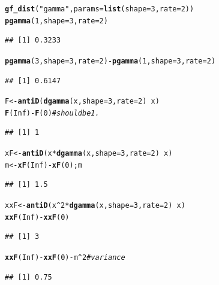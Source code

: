 \documentclass[twoside]{book}\usepackage[]{graphicx}\usepackage[]{xcolor}
\makeatletter
\newcommand{\hlnum}[1]{\textcolor[rgb]{0.686,0.059,0.569}{#1}}%
\newcommand{\hlstr}[1]{\textcolor[rgb]{0.192,0.494,0.8}{#1}}%
\newcommand{\hlcom}[1]{\textcolor[rgb]{0.678,0.584,0.686}{\textit{#1}}}%
\newcommand{\hlopt}[1]{\textcolor[rgb]{0,0,0}{#1}}%
\newcommand{\hlstd}[1]{\textcolor[rgb]{0.345,0.345,0.345}{#1}}%
\newcommand{\hlkwb}[1]{\textcolor[rgb]{0.69,0.353,0.396}{#1}}%
\newcommand{\hlkwc}[1]{\textcolor[rgb]{0.333,0.667,0.333}{#1}}%
\newcommand{\hlkwd}[1]{\textcolor[rgb]{0.737,0.353,0.396}{\textbf{#1}}}%
\newenvironment{kframe}{%
 \def\at@end@of@kframe{}%
 \ifinner\ifhmode%
  \def\at@end@of@kframe{\end{minipage}}%
  \begin{minipage}{\columnwidth}%
 \fi\fi%
 \def\FrameCommand##1{\hskip\@totalleftmargin \hskip-\fboxsep
 \colorbox{shadecolor}{##1}\hskip-\fboxsep
     \hskip-\linewidth \hskip-\@totalleftmargin \hskip\columnwidth}%
 \MakeFramed {\advance\hsize-\width
   \@totalleftmargin\z@ \linewidth\hsize
   \@setminipage}}%
 {\par\unskip\endMakeFramed%
 \at@end@of@kframe}
\newenvironment{knitrout}{}{} %
\makeatother
\begin{document}
\begin{solution}
\begin{knitrout}
\color{fgcolor}\begin{kframe}
\begin{alltt}
\hlkwd{gf_dist}\hlstd{(}\hlstr{"gamma"}\hlstd{,} \hlkwc{params} \hlstd{=} \hlkwd{list}\hlstd{(}\hlkwc{shape} \hlstd{=} \hlnum{3}\hlstd{,} \hlkwc{rate} \hlstd{=} \hlnum{2}\hlstd{))}
\hlkwd{pgamma}\hlstd{(}\hlnum{1}\hlstd{,} \hlkwc{shape} \hlstd{=} \hlnum{3}\hlstd{,} \hlkwc{rate} \hlstd{=} \hlnum{2}\hlstd{)}
\end{alltt}
\begin{verbatim}
## [1] 0.3233
\end{verbatim}
\begin{alltt}
\hlkwd{pgamma}\hlstd{(}\hlnum{3}\hlstd{,} \hlkwc{shape} \hlstd{=} \hlnum{3}\hlstd{,} \hlkwc{rate} \hlstd{=} \hlnum{2}\hlstd{)} \hlopt{-}  \hlkwd{pgamma}\hlstd{(}\hlnum{1}\hlstd{,} \hlkwc{shape} \hlstd{=} \hlnum{3}\hlstd{,} \hlkwc{rate} \hlstd{=} \hlnum{2}\hlstd{)}
\end{alltt}
\begin{verbatim}
## [1] 0.6147
\end{verbatim}
\begin{alltt}
\hlstd{F} \hlkwb{<-} \hlkwd{antiD}\hlstd{(}\hlkwd{dgamma}\hlstd{(x,} \hlkwc{shape} \hlstd{=} \hlnum{3}\hlstd{,} \hlkwc{rate} \hlstd{=} \hlnum{2}\hlstd{)} \hlopt{~} \hlstd{x)}
\hlkwd{F}\hlstd{(}\hlnum{Inf}\hlstd{)} \hlopt{-} \hlkwd{F}\hlstd{(}\hlnum{0}\hlstd{)}    \hlcom{# should be 1.}
\end{alltt}
\begin{verbatim}
## [1] 1
\end{verbatim}
\begin{alltt}
\hlstd{xF} \hlkwb{<-} \hlkwd{antiD}\hlstd{(x} \hlopt{*} \hlkwd{dgamma}\hlstd{(x,} \hlkwc{shape} \hlstd{=} \hlnum{3}\hlstd{,} \hlkwc{rate} \hlstd{=} \hlnum{2}\hlstd{)} \hlopt{~} \hlstd{x)}
\hlstd{m} \hlkwb{<-} \hlkwd{xF}\hlstd{(}\hlnum{Inf}\hlstd{)} \hlopt{-} \hlkwd{xF}\hlstd{(}\hlnum{0}\hlstd{); m}
\end{alltt}
\begin{verbatim}
## [1] 1.5
\end{verbatim}
\begin{alltt}
\hlstd{xxF} \hlkwb{<-} \hlkwd{antiD}\hlstd{(x}\hlopt{^}\hlnum{2} \hlopt{*} \hlkwd{dgamma}\hlstd{(x,} \hlkwc{shape} \hlstd{=} \hlnum{3}\hlstd{,} \hlkwc{rate} \hlstd{=} \hlnum{2}\hlstd{)} \hlopt{~} \hlstd{x)}
\hlkwd{xxF}\hlstd{(}\hlnum{Inf}\hlstd{)} \hlopt{-} \hlkwd{xxF}\hlstd{(}\hlnum{0}\hlstd{)}
\end{alltt}
\begin{verbatim}
## [1] 3
\end{verbatim}
\begin{alltt}
\hlkwd{xxF}\hlstd{(}\hlnum{Inf}\hlstd{)} \hlopt{-} \hlkwd{xxF}\hlstd{(}\hlnum{0}\hlstd{)} \hlopt{-} \hlstd{m}\hlopt{^}\hlnum{2} \hlcom{# variance}
\end{alltt}
\begin{verbatim}
## [1] 0.75
\end{verbatim}
\end{kframe}


\end{knitrout}
\end{solution}
\end{document}
